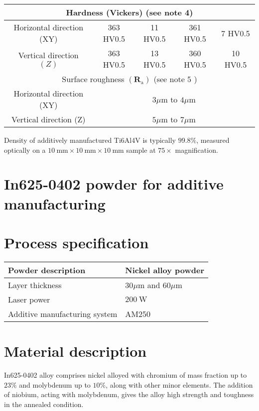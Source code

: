 \documentclass[10pt]{article}
\begin{document}
\begin{center}
\begin{tabular}{|c|c|c|c|c|}
\hline
\multicolumn{5}{|c|}{Hardness (Vickers) (see note 4)} \\
\hline
Horizontal direction (XY) & 363 HV0.5 & 11 HV0.5 & 361 HV0.5 & 7 HV0.5 \\
\hline
Vertical direction $(Z)$ & 363 HV0.5 & 13 HV0.5 & 360 HV0.5 & 10 HV0.5 \\
\hline
\multicolumn{5}{|c|}{Surface roughness $\left(\mathbf{R}_{\mathrm{a}}\right)$ (see note 5 )} \\
\hline
Horizontal direction (XY) & \multicolumn{4}{|c|}{$3 \mu \mathrm{m}$ to $4 \mu \mathrm{m}$} \\
\hline
Vertical direction (Z) & \multicolumn{4}{|c|}{$5 \mu \mathrm{m}$ to $7 \mu \mathrm{m}$} \\
\hline
\end{tabular}
\end{center}

Density of additively manufactured Ti6Al4V is typically $99.8 \%$, measured optically on a $10 \mathrm{~mm} \times 10 \mathrm{~mm} \times 10 \mathrm{~mm}$ sample at $75 \times$ magnification.

\section*{In625-0402 powder for additive manufacturing}
\section*{Process specification}
\begin{center}
\begin{tabular}{|l|l|}
\hline
Powder description & Nickel alloy powder \\
\hline
Layer thickness & $30 \mu \mathrm{m}$ and $60 \mu \mathrm{m}$ \\
\hline
Laser power & $200 \mathrm{~W}$ \\
\hline
Additive manufacturing system & AM250 \\
\hline
\end{tabular}
\end{center}

\section*{Material description}
In625-0402 alloy comprises nickel alloyed with chromium of mass fraction up to $23 \%$ and molybdenum up to $10 \%$, along with other minor elements. The addition of niobium, acting with molybdenum, gives the alloy high strength and toughness in the annealed condition.
\end{document}
